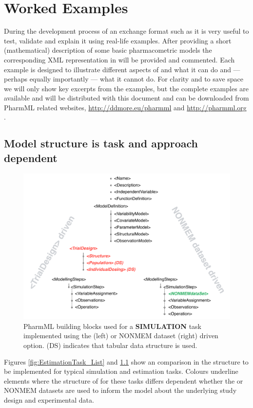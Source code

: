 \chapter{Worked Examples}
\label{chap:worked-egs}

During the development process of an exchange format such as \pharmml it is 
very useful to test, validate and explain it using real-life examples. 
After providing a short (mathematical) description of some basic pharmacometric 
models the corresponding XML representation in \pharmml will be provided and
commented. Each example is designed to illustrate different aspects of 
\pharmml and what it can do and --- perhaps equally importantly --- what it cannot 
do. For clarity and to save space we will only show key excerpts from the
examples, but the complete examples are available and will be
distributed with this document and can be downloaded from PharmML related 
websites, \url{http://ddmore.eu/pharmml} and \url{http://pharmml.org} . 

\section{Model structure is task and approach dependent}
\label{sec:eg-modelStructure}

\begin{figure}[ht!]
 \centering	
 \includegraphics[width=.8\linewidth]{pics/SimulationTask}%
 \caption{PharmML building blocks used for a \textbf{SIMULATION} task implemented 
 using the  (left) or NONMEM dataset (right) driven option. 
(DS) indicates that tabular data structure is used.}
 \label{fig:SimulationTask_List}
 \end{figure}
Figures \ref{fig:EstimationTask_List} and \ref{fig:SimulationTask_List} show 
an comparison in the structure to be implemented for typical simulation 
and estimation tasks.
Colours underline elements where the structure of 
\pharmml for these tasks differs dependent whether the 
or NONMEM datasets are used to inform the model about the underlying 
study design and experimental data.


